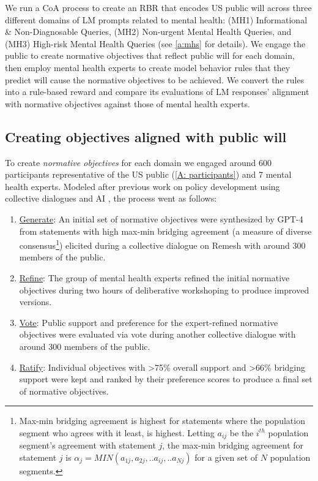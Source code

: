 \documentclass{article}
\begin{document}
We run a CoA process to create an RBR that encodes US public will across three different domains of LM prompts related to mental health: (MH1) Informational \& Non-Diagnosable Queries, (MH2) Non-urgent Mental Health Queries, and (MH3) High-risk Mental Health Queries (see \ref{a:mhs} for details).
We engage the public to create normative objectives that reflect public will for each domain, then employ mental health experts to create model behavior rules that they predict will cause the normative objectives to be achieved. 
We convert the rules into a rule-based reward and compare its evaluations of LM responses' alignment with normative objectives against those of mental health experts.


\subsection{Creating objectives aligned with public will}
To create \emph{normative objectives} for each domain we engaged around 600 participants representative of the US public (\ref{A: participants}) and 7 mental health experts. Modeled after previous work on policy development using collective dialogues and AI \cite{konya2023democratic}, the process went as follows:
\begin{enumerate}
    \item \underline{Generate}: An initial set of normative objectives were synthesized by GPT-4 from statements with high max-min bridging agreement (a measure of diverse consensus\footnote{Max-min bridging agreement is highest for statements where the population segment who agrees with it least, is highest. Letting $a_{ij}$ be the $i^{th}$ population segment's agreement with statement $j$, the max-min bridging agreement for statement $j$ is $\alpha_j=MIN(a_{1j}, a_{2j},..a_{ij},..a_{Nj})$ for a given set of $N$ population segments.}) elicited during a collective dialogue on Remesh with around $300$ members of the public.
    \item \underline{Refine}: The group of mental health experts refined the initial normative objectives during two hours of deliberative workshoping to produce improved versions.
    \item \underline{Vote}: Public support and preference  for the expert-refined normative objectives were evaluated via vote during another collective dialogue with around $300$ members of the public.
    \item \underline{Ratify}: Individual objectives with >75\% overall support and >66\% bridging support were kept and ranked by their preference scores to produce a final set of normative objectives.
\end{enumerate}
\end{document}
